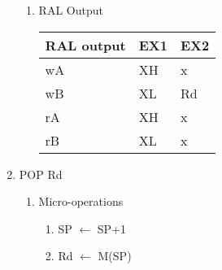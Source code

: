 \documentclass[12pt,letterpaper]{article}
\begin{document}
\begin{enumerate}
\begin{enumerate}
        \item RAL Output\\
            \begin{tabular}{l l l}
                 RAL output & EX1 & EX2 \\
                 \hline
                 wA & XH & x  \\
                 wB & XL & Rd\\
                 rA & XH & x \\
                 rB & XL & x \\
            \end{tabular}
    \end{enumerate}


    \item POP Rd
    \begin{enumerate}
        \item Micro-operations \\
            \begin{enumerate}[i]
                \item SP $\leftarrow$ SP+1
                \item Rd $\leftarrow$ M(SP)
            \end{enumerate}


\end{enumerate}
\end{enumerate}
\end{document}
